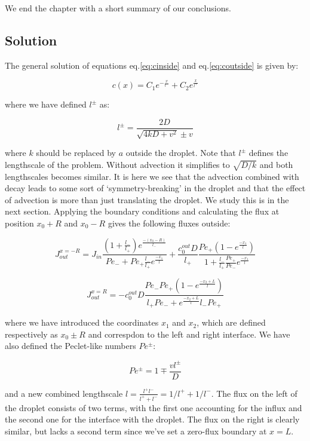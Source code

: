 \documentclass[12pt,a4paper,]{Dissertate}
\begin{document}
We end the chapter with a short summary of our conclusions.

\hypertarget{solution}{%
\subsection{Solution}\label{solution}}

The general solution of equations eq.\ref{eq:cinside} and
eq.\ref{eq:coutside} is given by:

\[
c(x) = C_1e^{-\frac{x}{l^-}}+C_2e^{\frac{x}{l^+}}
\]

where we have defined \(l^\pm\) as:

\begin{equation}
l^\pm= \frac{2D}{\sqrt{4kD+v^2}\pm v }
\label{eq:lengthscale}\end{equation}

where \(k\) should be replaced by \(a\) outside the droplet. Note that
\(l^\pm\) defines the lengthscale of the problem. Without advection it
simplifies to \(\sqrt{D/k}\) and both lengthscales becomes similar. It
is here we see that the advection combined with decay leads to some sort
of `symmetry-breaking' in the droplet and that the effect of advection
is more than just translating the droplet. We study this is in the next
section. Applying the boundary conditions and calculating the flux at
position \(x_0+R\) and \(x_0-R\) gives the following fluxes outside:

\begin{equation}
J_{out}^{x=-R} = J_{in}\frac{(1+\frac{l_-}{l_+})e^{\frac{-(x_0-R)}{l_-}}}{Pe_-+Pe_+\frac{l_-}{l_+}e^{\frac{-x_1}{l}}}
+\frac{c_0^{out}D}{l_+}\frac{Pe_+(1-e^{\frac{-x_1}{l}})}{1+\frac{l_-}{l_+}\frac{Pe_+}{Pe_-}e^{\frac{-x_1}{l}}}
\label{eq:leftflux}\end{equation}

\begin{equation}
J_{out}^{x=R} = -c_0^{out}D\frac{Pe_-Pe_+(1-e^{\frac{-x_2+L}{l}})}{l_+Pe_-+e^{\frac{-x_2+L}{l}}l_-Pe_+}
\label{eq:rightflux}\end{equation}

where we have introduced the coordinates \(x_1\) and \(x_2\), which are
defined respectively as \(x_0\pm R\) and correspdon to the left and
right interface. We have also defined the Peclet-like numbers
\(Pe^\pm\):

\[
Pe^\pm = 1 \mp \frac{vl^\pm}{D}
\]

and a new combined lengthscale
\(l = \frac{l^+l^-}{l^++l^-} = 1/l^++1/l^-\). The flux on the left of
the droplet consists of two terms, with the first one accounting for the
influx and the second one for the interface with the droplet. The flux
on the right is clearly similar, but lacks a second term since we've set
a zero-flux boundary at \(x=L\).
\end{document}
